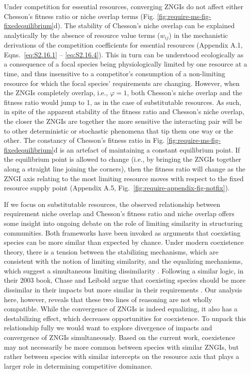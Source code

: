 Under competition for essential resources, converging ZNGIs do not affect either Chesson's fitness ratio or niche overlap terms (Fig. \ref{fig:require-ms-fig-fixedequilibrium}d). The stability of Chesson's niche overlap can be explained analytically by the absence of resource value terms ($w_{ij}$) in the mechanistic derivations of the competition coefficients for essential resources (Appendix A.1, Eqns.~\ref{eq:S2.16.1} -- \ref{eq:S2.16.4}). This in turn can be understood ecologically as a consequence of a focal species being physiologically limited by one resource at a time, and thus insensitive to a competitor's consumption of a non-limiting resource for which the focal species' requirements are changing. However, when the ZNGIs completely overlap, i.e., $\varphi = 1$, both Chesson's niche overlap and the fitness ratio would jump to 1, as in the case of substitutable resources. As such, in spite of the apparent stability of the fitness ratio and Chesson's niche overlap, the closer the ZNGIs are together the more sensitive the interacting pair will be to other deterministic or stochastic phenomena that tip them one way or the other. The constancy of Chesson's fitness ratio in Fig. \ref{fig:require-ms-fig-fixedequilibrium}d is an artefact of maintaining a constant equilibrium point. If the equilibrium point is allowed to change (i.e., by bringing the ZNGIs together along a straight line joining the corners), then the fitness ratio will change as the ZNGI axis relating to the most limiting resource moves with respect to the fixed resource supply point (Appendix A.5, Fig.~\ref{fig:require-appendix-fig-notfix}).    
\par


If we focus on substitutable resources, the observed relationship between requirement niche overlap and Chesson's fitness ratio and niche overlap offers some insight into ongoing debate on the role of limiting similarity in structuring communities. Both frameworks have been invoked as arguments that coexisting species can be more similar than expected by chance. Under modern coexistence theory, there is a tension between the stabilizing mechanisms, which are consistent with the notion of limiting similarity, and the equalizing mechanisms, which suggest a simultaneous limiting dissimilarity \citep{Chesson2000, Mayfield2010}. Following a similar logic, in their 2003 book, Chase and Leibold argue that coexisting species should be more dissimilar in their impacts but more similar in their requirements \citep[also see][]{Leibold1998}. Our analysis here, however, reveals that these two lines of reasoning are not wholly compatible. While the convergence of ZNGIs is indeed equalizing, it also has a destabilizing effect, which decreases opportunities for coexistence. To unpack this relationship fully we would want to explore divergence of impacts and convergence of ZNGIs simultaneously. Based on the current work, coexistence may not necessarily be more common between species with similar ZNGIs, but rather between species with similar intercepts on the resource axis that plays a larger role in determining competitive dominance.
\par


